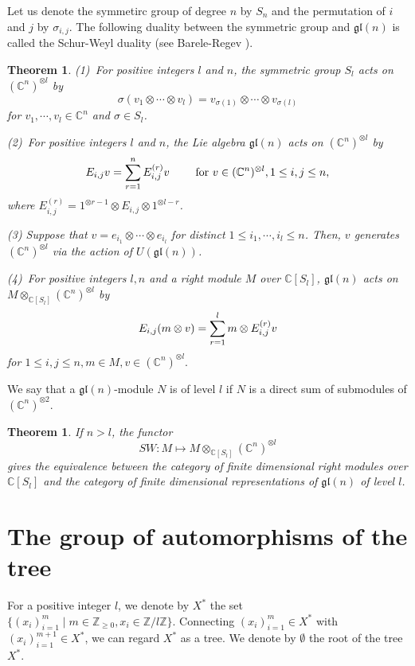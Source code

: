 \documentclass{article}
\newtheorem{Theorem}[equation]{Theorem}
\theoremstyle{definition}
\theoremstyle{remark}
\numberwithin{equation}{section}
\numberwithin{equation}{section}
\begin{document}
Let us denote the symmetirc group of degree $n$ by $S_n$ and the permutation of $i$ and $j$ by $\sigma_{i,j}$. 
The following duality between the symmetric group and $\mathfrak{gl}(n)$ is called the Schur-Weyl duality (see Barele-Regev \cite{BR}). 
\begin{Theorem}\label{SW1}
\textup{(1)}\ For positive integers $l$ and $n$, the symmetric group $S_l$ acts on $(\mathbb{C}^n)^{\otimes l}$ by
\begin{equation*}
\sigma(v_1\otimes\cdots\otimes v_l)=v_{\sigma(1)}\otimes\cdots\otimes v_{\sigma(l)}
\end{equation*}
for $v_1,\cdots,v_l\in\mathbb{C}^n$ and $\sigma\in S_l$.

\textup{(2)}\ For positive integers $l$ and $n$, the Lie algebra $\mathfrak{gl}(n)$ acts on $(\mathbb{C}^n)^{\otimes l}$ by
\[E_{i,j}v=\sum_{r=1}^n\limits E^{(r)}_{i,j}v\qquad\text{ for }v\in(\mathbb{C}^n)^{\otimes l},1\leq i,j\leq n,\]
where $E^{(r)}_{i,j}=1^{\otimes r-1}\otimes E_{i,j}\otimes 1^{\otimes l-r}$.

\textup{(3)} Suppose that $v=e_{i_1}\otimes\cdots\otimes e_{i_l}$ for distinct $1\leq i_1,\cdots,i_l\leq n$. Then, $v$ generates $(\mathbb{C}^n)^{\otimes l}$ via the action of $U(\mathfrak{gl}(n))$.

\textup{(4)}\ For positive integers $l,n$ and a right module $M$ over $\mathbb{C}[S_l]$, $\mathfrak{gl}(n)$ acts on $M\otimes_{\mathbb{C}[S_l]}(\mathbb{C}^n)^{\otimes l}$ by
\[
E_{i,j}(m\otimes v)=\sum_{r=1}^l\limits m\otimes E^{(r)}_{i,j}v
\]
for $1\leq i,j\leq n,m\in M,v\in(\mathbb{C}^n)^{\otimes l}.$
\end{Theorem}
We say that a $\mathfrak{gl}(n)$-module $N$ is of level $l$ if $N$ is a direct sum of submodules of $(\mathbb{C}^n)^{\otimes2}$.
\begin{Theorem}\label{SW2}
If $n>l$, the functor
\[
SW\colon M\mapsto M\otimes_{\mathbb{C}[S_l]}(\mathbb{C}^n)^{\otimes l}
\]
gives the equivalence between the category of finite dimensional right modules over $\mathbb{C}[S_l]$ and the category of finite dimensional representations of $\mathfrak{gl}(n)$ of level $l$.
\end{Theorem}
\section{The group of automorphisms of the tree}

For a positive integer $l$, we denote by $X^*$ the set $\{(x_i)_{i=1}^m\mid m\in\mathbb{Z}_{\geq0},x_i\in\mathbb{Z}/l\mathbb{Z}\}$. Connecting $(x_i)_{i=1}^m\in X^*$ with $(x_i)_{i=1}^{m+1}\in X^*$, we can regard $X^*$ as a tree. We denote by $\emptyset$ the root of the tree $X^*$. 
\end{document}
